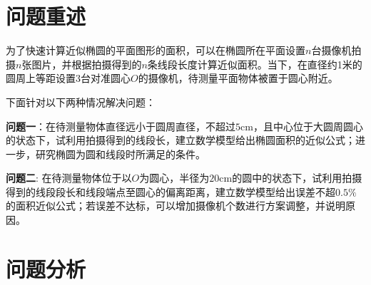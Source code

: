 \documentclass[a4paper,10.5pt]{ctexart}
\begin{document}
\section{问题重述}
\par 为了快速计算近似椭圆的平面图形的面积，可以在椭圆所在平面设置$n$台摄像机拍摄$n$张图片，并根据拍摄得到的$n$条线段长度计算近似面积。当下，在直径约1米的圆周上等距设置3台对准圆心$O$的摄像机，待测量平面物体被置于圆心附近。
\par 下面针对以下两种情况解决问题：
\par \textbf{问题一}：在待测量物体直径远小于圆周直径，不超过$5$cm，且中心位于大圆周圆心的状态下，试利用拍摄得到的线段长，建立数学模型给出椭圆面积的近似公式；进一步，研究椭圆为圆和线段时所满足的条件。
\par \textbf{问题二}: 在待测量物体位于以$O$为圆心，半径为$20$cm的圆中的状态下，试利用拍摄得到的线段段长和线段端点至圆心的偏离距离，建立数学模型给出误差不超$0.5\%$的面积近似公式；若误差不达标，可以增加摄像机个数进行方案调整，并说明原因。
\section{问题分析}
\end{document}
